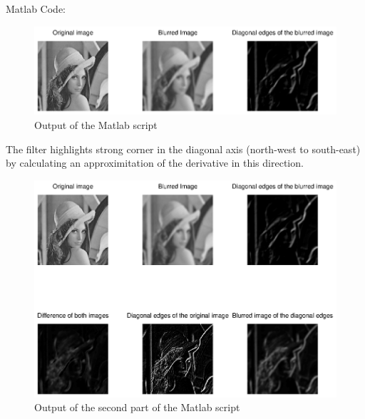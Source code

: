 \documentclass[DIN, pagenumber=false, fontsize=11pt, parskip=half]{scrartcl}
\begin{document}
    \subsection{}
    Matlab Code:
                  
    \begin{figure}[H]
        \centering
        \includegraphics[trim = {0 13cm 27cm 0}, clip,width=\textwidth]{lenaEdge1.eps}
        \caption{Output of the Matlab script}
    \end{figure}
    The filter highlights strong corner in the diagonal axis (north-west to south-east) by calculating
    an approximitation of the derivative in this direction.

                  
    \begin{figure}[H]
        \centering
        \includegraphics[trim = {0 10cm 27cm 0}, clip,width=\textwidth]{lenaEdge2.eps}
        \caption{Output of the second part of the Matlab script}
    \end{figure}

\end{document}
